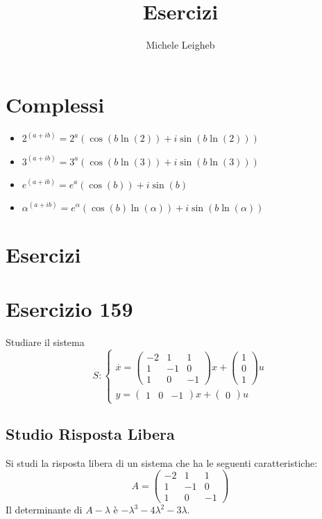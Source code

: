 \documentclass{article}
\title{Esercizi}
\author{Michele Leigheb}
\date{}
\begin{document}
\maketitle
\tableofcontents{}
\section{Complessi}
\begin{itemize}
	\item \(\displaystyle 2^{(a+ib)} = 2^a (\cos(b \ln(2)) + i\sin(b \ln(2))) \)
	\item \(\displaystyle 3^{(a+ib)} = 3^a (\cos(b \ln(3)) + i\sin(b \ln(3))) \)
	\item \(\displaystyle e^{(a+ib)} = e^a (\cos(b)) + i\sin(b) \)
	\item \(\displaystyle \alpha^{(a+ib)} = e^{\alpha} (\cos(b)\ln(\alpha)) + i\sin(b\ln(\alpha)) \)
\end{itemize}



\section{Esercizi}

\section{Esercizio 159 }
 Studiare il sistema \[S:\begin{cases}\overset{\cdot}{x} = \left(\begin{matrix}-2 & 1 & 1\\1 & -1 & 0\\1 & 0 & -1\end{matrix}\right) x+ \left(\begin{matrix}1\\0\\1\end{matrix}\right)u\\y = \left(\begin{matrix}1 & 0 & -1\end{matrix}\right) x +\left(\begin{matrix}0\end{matrix}\right) u\end{cases}\]\subsection{Studio Risposta Libera}
Si studi la risposta libera di un sistema che ha le seguenti caratteristiche: \[A = \left(\begin{matrix}-2 & 1 & 1\\1 & -1 & 0\\1 & 0 & -1\end{matrix}\right)\]
Il determinante di $A-\lambda$ è $ - \lambda^{3} - 4 \lambda^{2} - 3 \lambda $.
\end{document}
